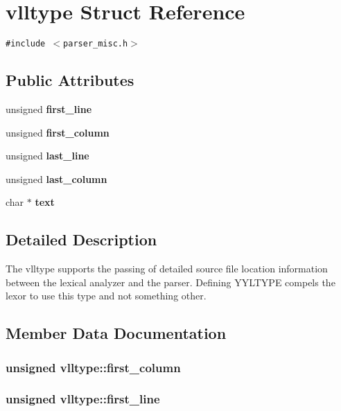 \section{vlltype  Struct Reference}
\label{structvlltype}
{\tt \#include $<$parser\_\-misc.h$>$}

\subsection*{Public Attributes}
\begin{CompactItemize}
\item 
unsigned {\bf first\_\-line}
\item 
unsigned {\bf first\_\-column}
\item 
unsigned {\bf last\_\-line}
\item 
unsigned {\bf last\_\-column}
\item 
char $\ast$ {\bf text}
\end{CompactItemize}


\subsection{Detailed Description}
The vlltype supports the passing of detailed source file location information between the lexical analyzer and the parser. Defining YYLTYPE compels the lexor to use this type and not something other. 



\subsection{Member Data Documentation}
\subsubsection{\setlength{\rightskip}{0pt plus 5cm}unsigned vlltype::first\_\-column}\label{structvlltype_m1}


\subsubsection{\setlength{\rightskip}{0pt plus 5cm}unsigned vlltype::first\_\-line}\label{structvlltype_m0}


